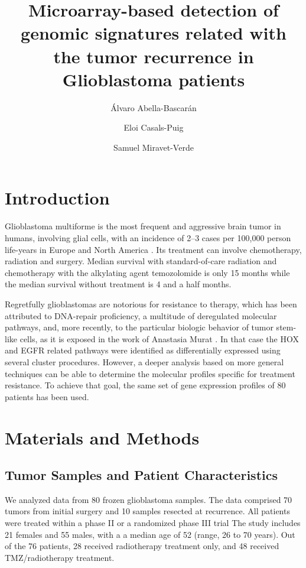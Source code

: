 \documentclass[9pt,twocolumn,twoside]{gsajnl}
\title{Microarray-based detection of genomic signatures related with the tumor recurrence in Glioblastoma patients}
\author[$\ast$,1]{Álvaro Abella-Bascarán}
\author[$\ast$]{Eloi Casals-Puig}
\author[$\ast$]{Samuel Miravet-Verde}
\affil[$\ast$]{Pompeu Fabra University, Barcelona (Spain)}
\begin{document}
\maketitle
\thispagestyle{firststyle}
\marginmark
\firstpagefootnote
{}

\vspace{-1cm}
\section*{Introduction}

Glioblastoma multiforme is the most frequent and aggressive brain tumor in humans, involving glial cells, with an incidence of 2–3 cases per 100,000 person life-years in Europe and North America \citep{Bleeker2012}. Its treatment can involve chemotherapy, radiation and surgery. Median survival with standard-of-care radiation and chemotherapy with the alkylating agent temozolomide is only 15 months  \citep{Johnson2012} while the median survival without treatment is 4 and a half months. 

Regretfully glioblastomas are notorious for resistance to therapy, which has been attributed to DNA-repair proficiency, a multitude of deregulated molecular pathways, and, more recently, to the particular biologic behavior of tumor stem-like cells, as it is exposed in the work of Anastasia Murat  \citep{Murat2008}. In that case the HOX and EGFR related pathways were identified as differentially expressed using several cluster procedures. However, a deeper analysis based on more general techniques can be able to determine the molecular profiles specific for treatment resistance. To achieve that goal, the same set of gene expression profiles of 80 patients has been used. 

\section*{Materials and Methods}

\subsection*{Tumor Samples and Patient Characteristics}

We analyzed data from 80 frozen glioblastoma samples. The data comprised 70 tumors from initial surgery and 10 samples resected at recurrence. All patients were treated within a phase II or a randomized phase III trial \citep{Stupp2002,Stupp2005}
The study includes 21 females and 55 males, with a a median age of 52 (range, 26 to 70 years). Out of the 76 patients, 28 received radiotherapy treatment only, and 48 received TMZ/radiotherapy treatment.
\end{document}

